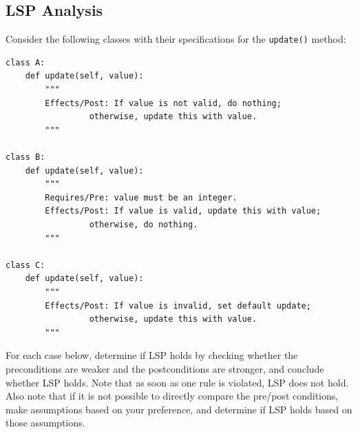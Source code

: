 \documentclass[oneside,11pt,dvipsnames]{book}
\newcommand{\code}[1]{\texttt{#1}}
\begin{document}
\subsection{LSP Analysis}\label{exercise:lsp-analysis}

Consider the following classes with their specifications for the \code{update()} method:

\begin{lstlisting}
class A:
    def update(self, value):
        """
        Effects/Post: If value is not valid, do nothing;
                 otherwise, update this with value.
        """

class B:
    def update(self, value):
        """
        Requires/Pre: value must be an integer.
        Effects/Post: If value is valid, update this with value;
                 otherwise, do nothing.
        """

class C:
    def update(self, value):
        """
        Effects/Post: If value is invalid, set default update;
                 otherwise, update this with value.
        """
\end{lstlisting}    

For each case below, determine if LSP holds by checking whether the preconditions are weaker and the postconditions are stronger, and conclude whether LSP holds. Note that as soon as one rule is violated, LSP does not hold. Also note that if it is not possible to directly compare the pre/post conditions, make assumptions based on your preference, and determine if LSP holds based on those assumptions. 
\end{document}
